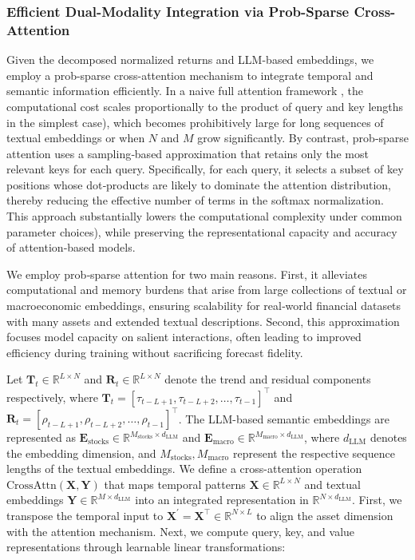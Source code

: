 \subsubsection{Efficient Dual-Modality Integration via Prob-Sparse Cross-Attention} Given the decomposed normalized returns and LLM-based embeddings, we employ a prob-sparse cross-attention mechanism \citep{informer_2021} to integrate temporal and semantic information efficiently. In a naive full attention framework \citep{waswani2017attention}, the computational cost scales proportionally to the product of query and key lengths in the simplest case), which becomes prohibitively large for long sequences of textual embeddings or when $N$ and $M$ grow significantly. By contrast, prob‐sparse attention uses a sampling‐based approximation that retains only the most relevant keys for each query. Specifically, for each query, it selects a subset of key positions whose dot‐products are likely to dominate the attention distribution, thereby reducing the effective number of terms in the softmax normalization. This approach substantially lowers the computational complexity under common parameter choices), while preserving the representational capacity and accuracy of attention‐based models.

We employ prob‐sparse attention for two main reasons. First, it alleviates computational and memory burdens that arise from large collections of textual or macroeconomic embeddings, ensuring scalability for real‐world financial datasets with many assets and extended textual descriptions. Second, this approximation focuses model capacity on salient interactions, often leading to improved efficiency during training without sacrificing forecast fidelity. 

Let $\mathbf{T}_{t} \in \mathbb{R}^{L \times N}$ and $\mathbf{R}_{t} \in \mathbb{R}^{L \times N}$ denote the trend and residual components respectively, where $ \mathbf{T}_{t} = [\tau_{t-L+1},\tau_{t-L+2},\ldots,\tau_{t-1}]^\top$ and $ \mathbf{R}_{t} = [\rho_{t-L+1},\rho_{t-L+2},\ldots,\rho_{t-1}]^\top$. The LLM-based semantic embeddings are represented as $\mathbf{E}_{\text{stocks}} \in \mathbb{R}^{M_{\text{stocks}} \times d_{\text{LLM}}}$ and $\mathbf{E}_{\text{macro}} \in \mathbb{R}^{M_{\text{macro}} \times d_{\text{LLM}}}$, where $d_{\text{LLM}}$ denotes the embedding dimension, and $M_{\text{stocks}}, M_{\text{macro}}$ represent the respective sequence lengths of the textual embeddings. We define a cross-attention operation $\text{CrossAttn}(\mathbf{X}, \mathbf{Y})$ that maps temporal patterns $\mathbf{X} \in \mathbb{R}^{L \times N}$ and textual embeddings $\mathbf{Y} \in \mathbb{R}^{M \times d_{\text{LLM}}}$ into an integrated representation in $\mathbb{R}^{N \times d_{\text{LLM}}}$. First, we transpose the temporal input to $\mathbf{X}^\prime = \mathbf{X}^\top \in \mathbb{R}^{N \times L}$ to align the asset dimension with the attention mechanism. Next, we compute query, key, and value representations through learnable linear transformations:

